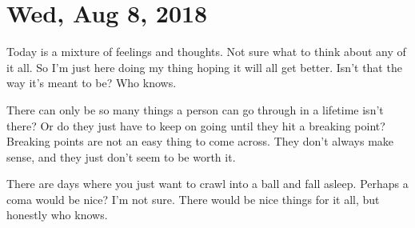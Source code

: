 \section{Wed, Aug 8, 2018}

Today is a mixture of feelings and thoughts. Not sure what to think about any of it
all. So I'm just here doing my thing hoping it will all get better. Isn't that the
way it's meant to be? Who knows.

There can only be so many things a person can go through in a lifetime isn't there?
Or do they just have to keep on going until they hit a breaking point? Breaking
points are not an easy thing to come across. They don't always make sense, and they
just don't seem to be worth it.

There are days where you just want to crawl into a ball and fall asleep. Perhaps a
coma would be nice? I'm not sure. There would be nice things for it all, but honestly
who knows.